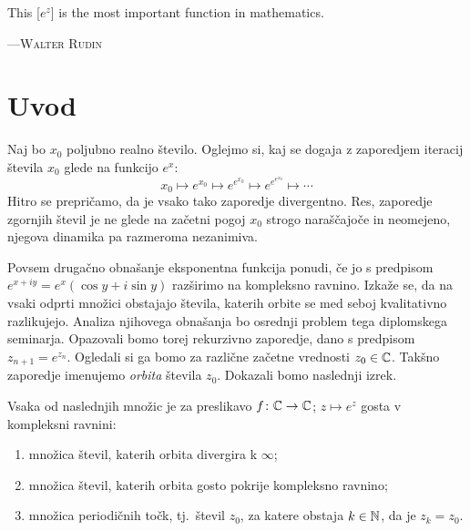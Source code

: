 \let\origthefootnote\thefootnote
\renewcommand{\thefootnote}{\fnsymbol{footnote}}

\epigraph{
    This \textup{[\(e^z\)]} is the most important function in mathematics.
}{
    \textsc{---Walter Rudin}\footnotemark
}


\let\thefootnote\origthefootnote

\section{Uvod} \label{sec:intro}

Naj bo \(x_0\) poljubno realno število. Oglejmo si, kaj se dogaja z zaporedjem iteracij števila \(x_0\) glede na funkcijo \(e^{x}\):
\[x_0 \mapsto e^{x_0} \mapsto e^{e^{x_0}} \mapsto e^{e^{e^{x_0}}} \mapsto \cdots\]
Hitro se prepričamo, da je vsako tako zaporedje divergentno. Res, zaporedje zgornjih števil je ne glede na začetni pogoj \(x_0\) strogo naraščajoče in neomejeno, njegova dinamika pa razmeroma nezanimiva.

Povsem drugačno obnašanje eksponentna funkcija ponudi, če jo s predpisom \(e^{x + iy} = e^x (\cos y + i \sin y)\) razširimo na kompleksno ravnino. Izkaže se, da na vsaki odprti množici obstajajo števila, katerih orbite se med seboj kvalitativno razlikujejo. Analiza njihovega obnašanja bo osrednji problem tega diplomskega seminarja. Opazovali bomo torej rekurzivno zaporedje, dano s predpisom \(z_{n + 1} = e^{z_n}\). Ogledali si ga bomo za različne začetne vrednosti \(z_0 \in \mathbb C\). Takšno zaporedje imenujemo \emph{orbita} števila \(z_0\). Dokazali bomo naslednji izrek.

\begin{izrek} \label{thm:orbits}
    Vsaka od naslednjih množic je za preslikavo \(f \colon \mathbb C \to \mathbb C\); \(z \mapsto e^{z}\) gosta v kompleksni ravnini:
    \begin{enumerate}
        \item množica števil, katerih orbita divergira k \(\infty\);
        \item množica števil, katerih orbita gosto pokrije kompleksno ravnino;
        \item množica periodičnih točk, tj.~števil \(z_0\), za katere obstaja \(k \in \mathbb N\), da je \(z_k = z_0\).
    \end{enumerate}
\end{izrek}

